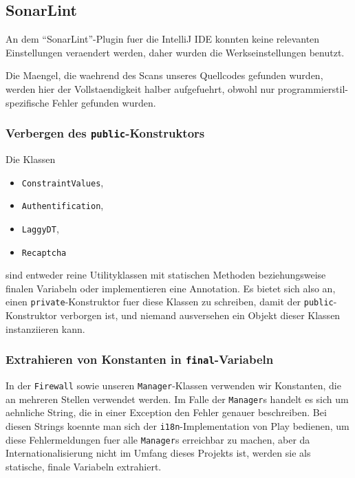 \documentclass[12pt,DIV14,BCOR10mm,a4paper,twoside,parskip=half-,headsepline,headinclude,english,ngerman,bibliography=totocnumbered]{scrreprt}
\begin{document}
\subsection{SonarLint}

An dem \enquote{SonarLint}-Plugin fuer die IntelliJ IDE konnten keine relevanten Einstellungen veraendert werden, daher wurden die Werkseinstellungen benutzt.

Die Maengel, die waehrend des Scans unseres Quellcodes gefunden wurden, werden hier der Vollstaendigkeit halber aufgefuehrt, obwohl nur programmierstil-spezifische Fehler gefunden wurden.

\subsubsection{Verbergen des \texttt{public}-Konstruktors}

Die Klassen

\begin{itemize}
  \item \texttt{ConstraintValues},
  \item \texttt{Authentification},
  \item \texttt{LaggyDT},
  \item \texttt{Recaptcha}
\end{itemize}

sind entweder reine Utilityklassen mit statischen Methoden beziehungsweise finalen Variabeln oder implementieren eine Annotation.
Es bietet sich also an, einen \texttt{private}-Konstruktor fuer diese Klassen zu schreiben, damit der \texttt{public}-Konstruktor verborgen ist, und niemand ausversehen ein Objekt dieser Klassen instanziieren kann.

\subsubsection{Extrahieren von Konstanten in \texttt{final}-Variabeln}

In der \texttt{Firewall} sowie unseren \texttt{Manager}-Klassen verwenden wir Konstanten, die an mehreren Stellen verwendet werden.
Im Falle der \texttt{Manager}s handelt es sich um aehnliche String, die in einer Exception den Fehler genauer beschreiben.
Bei diesen Strings koennte man sich der \texttt{i18n}-Implementation von Play bedienen, um diese Fehlermeldungen fuer alle \texttt{Manager}s erreichbar zu machen, aber da Internationalisierung nicht im Umfang dieses Projekts ist, werden sie als statische, finale Variabeln extrahiert.
\end{document}

